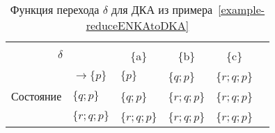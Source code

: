 \begin{table}[H]
\centering
\begin{tabular}{llllll}
\toprule
%
\multicolumn{2}{c}{\multirow{2}{*}{\Large $\delta$}}
	& \multicolumn{3}{c}{\text{Вход}} \\
%
\cmidrule(rl){3-5}
%
\multicolumn{2}{c}{}
    & \multicolumn{1}{c}{\{a\}}
    & \multicolumn{1}{c}{\{b\}}
    & \multicolumn{1}{c}{\{c\}} \\
%
\midrule
%
\multirow{5}{*}{Состояние}
    & $\to \{p\}$ & $\{p\}$  		& \{$q;p$\} 		& \{$r;q;p$\}  	\\
    & $\{q;p\}$ & \{$q;p$\} 	& \{$r;q;p$\} 		& \{$r;q;p$\} 	     \\
    & $\boxed{\{r;q;p\}}$ & \{$r;q;p$\} 	& \{$r;q;p$\} 		& \{$r;q;p$\} 	\\
\bottomrule
\end{tabular}
\caption{Функция перехода $\delta$ для ДКА из примера~\ref{example-reduceENKAtoDKA}}
\label{tab6}
\end{table}
